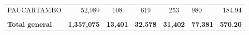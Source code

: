 \begin{tabular}{lrccclr}
	\cellcolor[HTML]{C6E0B4}PAUCARTAMBO                            & 52,989                                                         & 108                                                         & 619                  & 253                      & 980                                                                 & 184.94                                                                       \\
	& \multicolumn{1}{l}{}                                           & \multicolumn{1}{l}{}                                        & \multicolumn{1}{l}{} & \multicolumn{1}{l}{}     &                                                                     & \multicolumn{1}{l}{}                                                         \\
	\rowcolor[HTML]{DDEBF7} 
	\textbf{Total   general}                                       & \textbf{1,357,075}                                             & \multicolumn{1}{r}{\cellcolor[HTML]{DDEBF7}\textbf{13,401}} & \textbf{32,578}      & \textbf{31,402}          & \textbf{77,381}                                                     & \textbf{570.20}                                                             
\end{tabular}